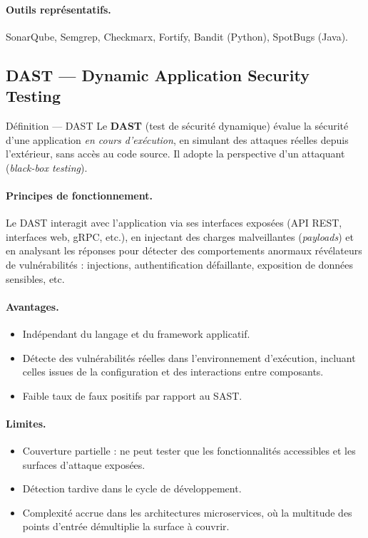 \paragraph{Outils représentatifs.}
SonarQube, Semgrep, Checkmarx, Fortify, Bandit (Python), SpotBugs (Java).

\subsection{DAST --- Dynamic Application Security Testing}

\begin{definitionbox}{Définition --- DAST}
  Le \textbf{DAST} (test de sécurité dynamique) évalue la sécurité d'une
  application \textit{en cours d'exécution}, en simulant des attaques réelles
  depuis l'extérieur, sans accès au code source. Il adopte la perspective
  d'un attaquant (\textit{black-box testing}).
\end{definitionbox}

\paragraph{Principes de fonctionnement.}
Le DAST interagit avec l'application via ses interfaces exposées (API REST,
interfaces web, gRPC, etc.), en injectant des charges malveillantes
(\textit{payloads}) et en analysant les réponses pour détecter des comportements
anormaux révélateurs de vulnérabilités : injections, authentification défaillante,
exposition de données sensibles, etc.

\paragraph{Avantages.}
\begin{itemize}
  \item Indépendant du langage et du framework applicatif.
  \item Détecte des vulnérabilités réelles dans l'environnement d'exécution,
    incluant celles issues de la configuration et des interactions entre composants.
  \item Faible taux de faux positifs par rapport au SAST.
\end{itemize}

\paragraph{Limites.}
\begin{itemize}
  \item Couverture partielle : ne peut tester que les fonctionnalités accessibles
    et les surfaces d'attaque exposées.
  \item Détection tardive dans le cycle de développement.
  \item Complexité accrue dans les architectures microservices, où la multitude
    des points d'entrée démultiplie la surface à couvrir.
\end{itemize}


